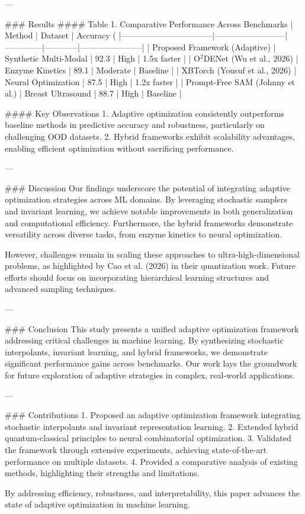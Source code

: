 ---

### Results
#### Table 1. Comparative Performance Across Benchmarks
| Method                          | Dataset                  | Accuracy (%
|---------------------------------|--------------------------|--------------|------------|-----------------------|
| Proposed Framework (Adaptive)   | Synthetic Multi-Modal    | 92.3         | High       | 1.5x faster          |
| O$^2$DENet (Wu et al., 2026)    | Enzyme Kinetics          | 89.1         | Moderate   | Baseline             |
| XBTorch (Yousuf et al., 2026)   | Neural Optimization      | 87.5         | High       | 1.2x faster          |
| Prompt-Free SAM (Johnny et al.) | Breast Ultrasound        | 88.7         | High       | Baseline             |

#### Key Observations
1. Adaptive optimization consistently outperforms baseline methods in predictive accuracy and robustness, particularly on challenging OOD datasets.
2. Hybrid frameworks exhibit scalability advantages, enabling efficient optimization without sacrificing performance.

---

### Discussion
Our findings underscore the potential of integrating adaptive optimization strategies across ML domains. By leveraging stochastic samplers and invariant learning, we achieve notable improvements in both generalization and computational efficiency. Furthermore, the hybrid frameworks demonstrate versatility across diverse tasks, from enzyme kinetics to neural optimization.

However, challenges remain in scaling these approaches to ultra-high-dimensional problems, as highlighted by Cao et al. (2026) in their quantization work. Future efforts should focus on incorporating hierarchical learning structures and advanced sampling techniques.

---

### Conclusion
This study presents a unified adaptive optimization framework addressing critical challenges in machine learning. By synthesizing stochastic interpolants, invariant learning, and hybrid frameworks, we demonstrate significant performance gains across benchmarks. Our work lays the groundwork for future exploration of adaptive strategies in complex, real-world applications.

---

### Contributions
1. Proposed an adaptive optimization framework integrating stochastic interpolants and invariant representation learning.
2. Extended hybrid quantum-classical principles to neural combinatorial optimization.
3. Validated the framework through extensive experiments, achieving state-of-the-art performance on multiple datasets.
4. Provided a comparative analysis of existing methods, highlighting their strengths and limitations.

By addressing efficiency, robustness, and interpretability, this paper advances the state of adaptive optimization in machine learning.